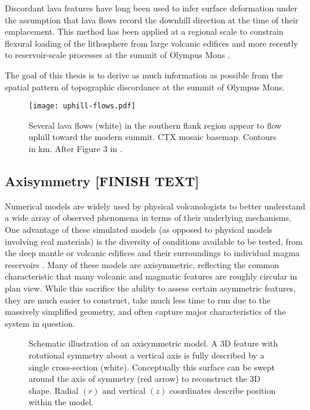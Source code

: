 Discordant lava features have long been used to infer surface deformation under the assumption that lava flows record the downhill direction at the time of their emplacement. This method has been applied at a regional scale to constrain flexural loading of the lithosphere from large volcanic edifices \parencite{mouginis-mark_ancient_1982,isherwood_volcanic_2013,chadwick_late_2015} and more recently to reservoir-scale processes at the summit of Olympus Mons \parencite{mouginis-mark_late-stage_2019}.

The goal of this thesis is to derive as much information as possible from the spatial pattern of topographic discordance at the summit of Olympus Mons. 

\begin{figure}
    \centering
    \texttt{[image: uphill-flows.pdf]}
    \caption[Discordant lava flows]{Several lava flows (white) in the southern flank region appear to flow uphill toward the modern summit. \acs{CTX} mosaic basemap. Contours in \unit{\km}. After Figure 3 in \textcite{mouginis-mark_late-stage_2019}.}%
    \label{fig:uphill-flows}
\end{figure}

\subsection{Axisymmetry [FINISH TEXT]}

Numerical models are widely used by physical volcanologists to better understand a wide array of observed phenomena in terms of their underlying mechanisms. One advantage of these simulated models (as opposed to physical models involving real materials) is the diversity of conditions available to be tested, from the deep mantle \parencite[e.g.,][]{redmond_numerical_2004,ogawa_four-stage_2021} or volcanic edifices and their surroundings \parencite[e.g.,][]{isherwood_volcanic_2013} to individual magma reservoirs \parencite[e.g.,][]{grosfils_magma_2007,grosfils_elastic_2015}. Many of these models are axisymmetric, reflecting the common characteristic that many volcanic and magmatic features are roughly circular in plan view. While this sacrifice the ability to assess certain asymmetric features, they are much easier to construct, take much less time to run due to the massively simplified geometry, and often capture major characteristics of the system in question.

\begin{figure}
    \caption[Axisymmetry]{Schematic illustration of an axisymmetric model. A 3D feature with rotational symmetry about a vertical axis is fully described by a single cross-section (white). Conceptually this surface can be swept around the axis of symmetry (red arrow) to reconstruct the 3D shape. Radial $(r)$ and vertical $(z)$ coordinates describe position within the model.}%
    \label{fig:axisymmetry}
\end{figure}    

